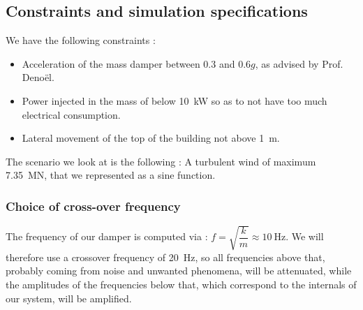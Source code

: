 \subsection{Constraints and simulation specifications}
We have the following constraints : 
\begin{itemize}
    \item Acceleration of the mass damper between \num{0.3} and \num{0.6}$g$, as advised by Prof. Denoël.
    \item Power injected in the mass of below \SI{10}{\kilo\watt} so as to not have too much electrical consumption.
    \item Lateral movement of the top of the building not above \SI{1}{\meter}.
\end{itemize}
The scenario we look at is the following : 
A turbulent wind of maximum \SI{7.35}{\mega\newton}, that we represented as a sine function.
\subsubsection{Choice of cross-over frequency}
The frequency of our damper is computed via : $f = \sqrt{\dfrac{k}{m}} \approx \SI{10}{\hertz}$. We will therefore use a crossover frequency of \SI{20}{\hertz}, so all frequencies above that, probably coming from noise and unwanted phenomena, will be attenuated, while the amplitudes of the frequencies below that, which correspond to the internals of our system, will be amplified.
